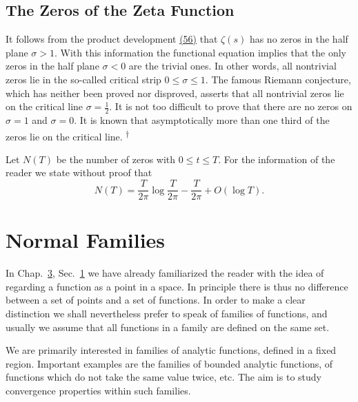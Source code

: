 \setcounter{section}{4}\setcounter{subsection}{3}\subsection{The Zeros of the Zeta Function}\label{sec:5.4.4}
It follows from the product development \hyperref[eq:5.56]{(56)} that $\zeta(s)$ has no zeros in the half plane $\sigma > 1$. With this information the functional equation implies that the only zeros in the half plane $\sigma < 0$ are the trivial ones. In other words, all nontrivial zeros lie in the so-called critical strip $0 \leq \sigma \leq 1$. The famous Riemann conjecture, which has neither been proved nor disproved, asserts that all nontrivial zeros lie on the critical line $\sigma = \frac{1}{2}$. It is not too difficult to prove that there are no zeros on $\sigma = 1$ and $\sigma = 0$. It is known that asymptotically more than one third of the zeros lie on the critical line. \hyperlink{fn:234:dagger}{\textsuperscript{\ensuremath{\dagger}}}

Let $N(T)$ be the number of zeros with $0 \leq t \leq T$. For the information of the reader we state without proof that
\begin{equation*}
N (T) = \frac {T}{2 \pi} \log \frac {T}{2 \pi} - \frac {T}{2 \pi} + O (\log T).
\end{equation*}
\begingroup\renewcommand{\thefootnote}{}\endgroup

\setcounter{section}{4}\section{Normal Families}\label{sec:5.5}
In Chap.~\hyperref[chap:3]{3}, Sec.~\hyperref[sec:3.1]{1} we have already familiarized the reader with the idea of regarding a function as a point in a space. In principle there is thus no difference between a set of points and a set of functions. In order to make a clear distinction we shall nevertheless prefer to speak of families of functions, and usually we assume that all functions in a family are defined on the same set.

We are primarily interested in families of analytic functions, defined in a fixed region. Important examples are the families of bounded analytic functions, of functions which do not take the same value twice, etc. The aim is to study convergence properties within such families.

